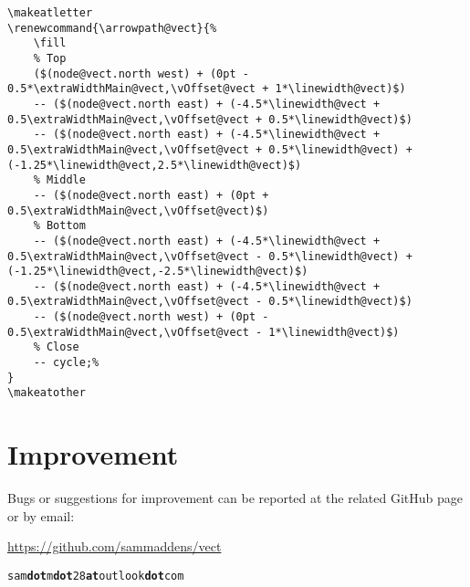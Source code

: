 \documentclass[12pt]{article}
\begin{document}
\begin{lstlisting}
\makeatletter
\renewcommand{\arrowpath@vect}{%
	\fill
	% Top
	($(node@vect.north west) + (0pt - 0.5*\extraWidthMain@vect,\vOffset@vect + 1*\linewidth@vect)$)
	-- ($(node@vect.north east) + (-4.5*\linewidth@vect + 0.5\extraWidthMain@vect,\vOffset@vect + 0.5*\linewidth@vect)$)
	-- ($(node@vect.north east) + (-4.5*\linewidth@vect + 0.5\extraWidthMain@vect,\vOffset@vect + 0.5*\linewidth@vect) + (-1.25*\linewidth@vect,2.5*\linewidth@vect)$)
	% Middle
	-- ($(node@vect.north east) + (0pt + 0.5\extraWidthMain@vect,\vOffset@vect)$)
	% Bottom
	-- ($(node@vect.north east) + (-4.5*\linewidth@vect + 0.5\extraWidthMain@vect,\vOffset@vect - 0.5*\linewidth@vect) + (-1.25*\linewidth@vect,-2.5*\linewidth@vect)$)
	-- ($(node@vect.north east) + (-4.5*\linewidth@vect + 0.5\extraWidthMain@vect,\vOffset@vect - 0.5*\linewidth@vect)$)
	-- ($(node@vect.north west) + (0pt - 0.5\extraWidthMain@vect,\vOffset@vect - 1*\linewidth@vect)$)
	% Close
	-- cycle;%
}
\makeatother
\end{lstlisting}

\makeatletter
\renewcommand{\arrowpath@vect}{%
	\fill
	($(node@vect.north west) + (0pt - 0.5*\extraWidthMain@vect,\vOffset@vect + 1*\linewidth@vect)$)
	-- ($(node@vect.north east) + (-4.5*\linewidth@vect + 0.5\extraWidthMain@vect,\vOffset@vect + 0.5*\linewidth@vect)$)
	-- ($(node@vect.north east) + (-4.5*\linewidth@vect + 0.5\extraWidthMain@vect,\vOffset@vect + 0.5*\linewidth@vect) + (-1.25*\linewidth@vect,2.5*\linewidth@vect)$)
	-- ($(node@vect.north east) + (0pt + 0.5\extraWidthMain@vect,\vOffset@vect)$)
	-- ($(node@vect.north east) + (-4.5*\linewidth@vect + 0.5\extraWidthMain@vect,\vOffset@vect - 0.5*\linewidth@vect) + (-1.25*\linewidth@vect,-2.5*\linewidth@vect)$)
	-- ($(node@vect.north east) + (-4.5*\linewidth@vect + 0.5\extraWidthMain@vect,\vOffset@vect - 0.5*\linewidth@vect)$)
	-- ($(node@vect.north west) + (0pt - 0.5\extraWidthMain@vect,\vOffset@vect - 1*\linewidth@vect)$)
	-- cycle;%
}
\makeatother

{\centering{}\par}

\section{Improvement}

Bugs or suggestions for improvement can be reported at the related GitHub page or by email:
\begin{bulItem}
\item \url{https://github.com/sammaddens/vect}
\item \tt sam{\color{blue}\textbf{dot}}m{\color{blue}\textbf{dot}}28{\color{blue}\textbf{at}}outlook{\color{blue}\textbf{dot}}com
\end{bulItem}
\end{document}
